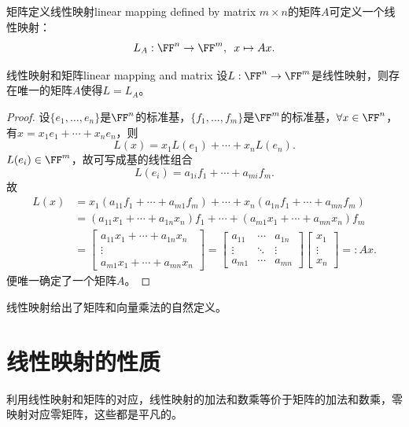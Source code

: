\begin{example}{矩阵定义线性映射}{linear mapping defined by matrix}
	$m\times n$的矩阵$A$可定义一个线性映射：
	\begin{equation}
		L_A:\FF^n\to\FF^m,\enspace x\mapsto Ax.
	\end{equation}
\end{example}
\begin{theorem}{线性映射和矩阵}{linear mapping and matrix}
	设$L:\FF^n\to\FF^m$是线性映射，则存在唯一的矩阵$A$使得$L=L_A$。
\end{theorem}
\begin{proof}
	设$\{e_1,\ldots,e_n\}$是$\FF^n$的标准基，$\{f_1,\ldots,f_m\}$是$\FF^m$的标准基，$\forall x\in\FF^n$，有$x=x_1e_1+\cdots+x_ne_n$，则
	\[
		L(x)=x_1L(e_1)+\cdots+x_nL(e_n).
	\]
	$L(e_i)\in\FF^m$，故可写成基的线性组合
	\[
		L(e_i)=a_{1i}f_1+\cdots+a_{mi}f_m.
	\]
	故
	\begin{align*}
		L(x)&=x_1(a_{11}f_1+\cdots+a_{m1}f_m)+\cdots+x_n(a_{1n}f_1+\cdots+a_{mn}f_m)\\
		&=(a_{11}x_1+\cdots+a_{1n}x_n)f_1+\cdots+(a_{m1}x_1+\cdots+a_{mn}x_n)f_m\\
		&=\begin{bmatrix}
			a_{11}x_1+\cdots+a_{1n}x_n\\\vdots\\
			a_{m1}x_1+\cdots+a_{mn}x_n
		\end{bmatrix}=\begin{bmatrix}
			a_{11}&\cdots&a_{1n}\\
			\vdots&\ddots&\vdots\\
			a_{m1}&\cdots&a_{mn}
		\end{bmatrix}\begin{bmatrix}
			x_1\\\vdots\\x_n
		\end{bmatrix}=:Ax.
	\end{align*}
	便唯一确定了一个矩阵$A$。
\end{proof}

\begin{remark}
	线性映射给出了矩阵和向量乘法的自然定义。
\end{remark}

\section{线性映射的性质}
利用线性映射和矩阵的对应，线性映射的加法和数乘等价于矩阵的加法和数乘，零映射对应零矩阵，这些都是平凡的。

